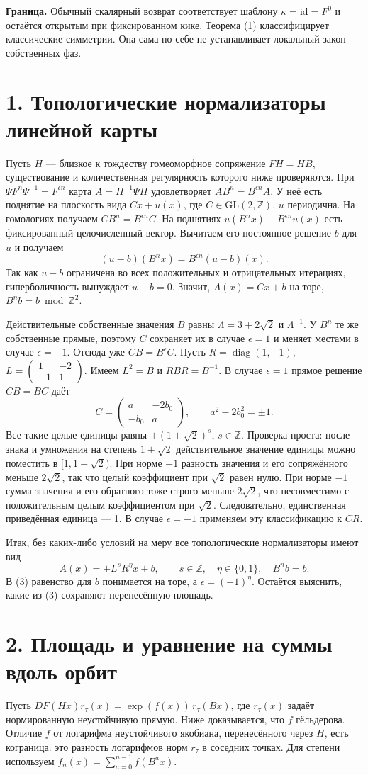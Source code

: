 \documentclass[11pt,a4paper]{article}
\newcommand{\Z}{\mathbb Z}
\newcommand{\sect}[1]{\section*{\sffamily\color{ink}#1}}
\begin{document}
\textbf{Граница.} Обычный скалярный возврат соответствует шаблону $\kappa=\mathrm{id}=F^0$ и остаётся открытым при фиксированном кике. Теорема (1) классифицирует классические симметрии. Она сама по себе не устанавливает локальный закон собственных фаз.
\newpage
\sect{1. Топологические нормализаторы линейной карты}
Пусть $H$ --- близкое к тождеству гомеоморфное сопряжение $F H=HB$, существование и количественная регулярность которого ниже проверяются. При $\Psi F^n\Psi^{-1}=F^{\epsilon n}$ карта $A=H^{-1}\Psi H$ удовлетворяет $A B^n=B^{\epsilon n} A$. У неё есть поднятие на плоскость вида $Cx+u(x)$, где $C\in\mathrm{GL}(2,\Z)$, $u$ периодична. На гомологиях получаем $CB^n=B^{\epsilon n}C$. На поднятиях $u(B^n x)-B^{\epsilon n}u(x)$ есть фиксированный целочисленный вектор. Вычитаем его постоянное решение $b$ для $u$ и получаем
\[
                 (u-b)(B^n x)=B^{\epsilon n}(u-b)(x).
\]
Так как $u-b$ ограничена во всех положительных и отрицательных итерациях, гиперболичность вынуждает $u-b=0$. Значит, $A(x)=Cx+b$ на торе, $B^n b=b\bmod\Z^2$.

Действительные собственные значения $B$ равны $\Lambda=3+2\sqrt2$ и $\Lambda^{-1}$. У $B^n$ те же собственные прямые, поэтому $C$ сохраняет их в случае $\epsilon=1$ и меняет местами в случае $\epsilon=-1$. Отсюда уже $CB=B^\epsilon C$. Пусть $R=\operatorname{diag}(1,-1)$, $L=\left(\begin{smallmatrix}1&-2\\-1&1\end{smallmatrix}\right)$. Имеем $L^2=B$ и $RBR=B^{-1}$. В случае $\epsilon=1$ прямое решение $CB=BC$ даёт
\[
                 C=\begin{pmatrix}a&-2b_0\\-b_0&a\end{pmatrix},
              \qquad a^2-2b_0^2=\pm1 .
\]
Все такие целые единицы равны $\pm(1+\sqrt2)^s$, $s\in\Z$. Проверка проста: после знака и умножения на степень $1+\sqrt2$ действительное значение единицы можно поместить в $[1,1+\sqrt2)$. При норме $+1$ разность значения и его сопряжённого меньше $2\sqrt2$, так что целый коэффициент при $\sqrt2$ равен нулю. При норме $-1$ сумма значения и его обратного тоже строго меньше $2\sqrt2$, что несовместимо с положительным целым коэффициентом при $\sqrt2$. Следовательно, единственная приведённая единица --- 1. В случае $\epsilon=-1$ применяем эту классификацию к $CR$.

Итак, без каких-либо условий на меру все топологические нормализаторы имеют вид
\[
           A(x)=\pm L^s R^\eta x+b,\qquad
           s\in\Z,\quad \eta\in\{0,1\},\quad B^n b=b .
                                                                    \tag{3}
\]
В (3) равенство для $b$ понимается на торе, а $\epsilon=(-1)^\eta$. Остаётся выяснить, какие из (3) сохраняют перенесённую площадь.
\newpage
\sect{2. Площадь и уравнение на суммы вдоль орбит}
Пусть $D F(Hx)r_\tau(x)=\exp(f(x))\,r_\tau(Bx)$, где $r_\tau(x)$ задаёт нормированную неустойчивую прямую. Ниже доказывается, что $f$ гёльдерова. Отличие $f$ от логарифма неустойчивого якобиана, перенесённого через $H$, есть кограница: это разность логарифмов норм $r_\tau$ в соседних точках. Для степени используем $f_n(x)=\sum_{a=0}^{n-1}f(B^a x)$.
\end{document}
